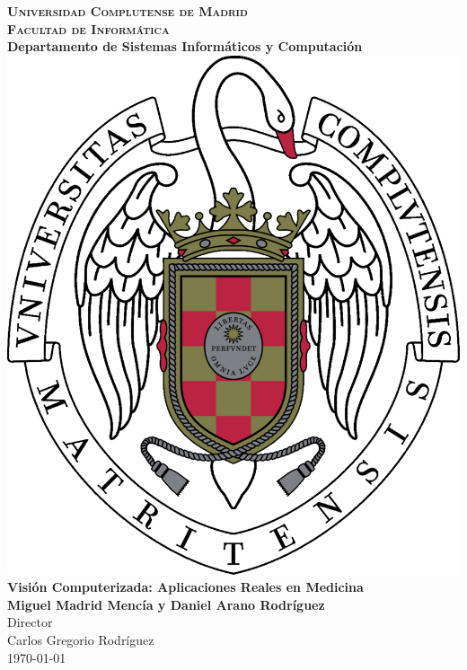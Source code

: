 
\begin{titlepage}
\begin{center}

  \textbf{\textsc{\LARGE Universidad Complutense de Madrid}}\\[1cm]
  \textbf{\textsc{\Large Facultad de Informática}}\\
  \textbf{Departamento de Sistemas Informáticos y Computación}\\[2cm]
  \includegraphics[scale=0.17]{imagenes/logo-ucm.pdf}\\[2cm]
  \textbf{\LARGE Visión Computerizada: Aplicaciones Reales en Medicina}\\[1cm]
  \textbf{\large Miguel Madrid Mencía y Daniel Arano Rodríguez}\\[2cm]
  Director\\
  \large Carlos Gregorio Rodríguez\\
  \vfill
  \today
\end{center}
\end{titlepage}
\let\cleardoublepage\clearpage